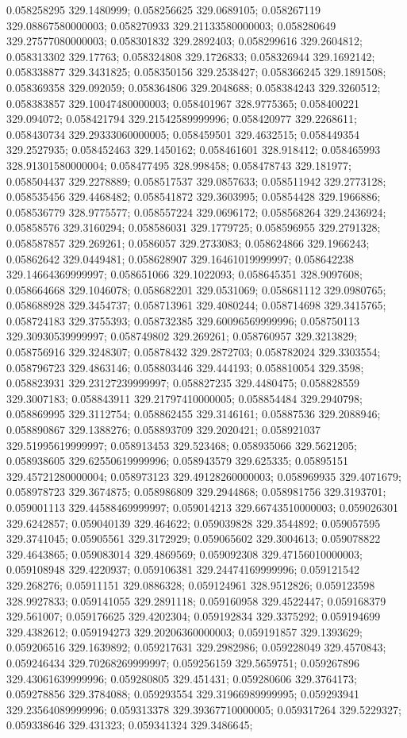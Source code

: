 0.058258295 329.1480999; 0.058256625 329.0689105; 0.058267119 329.08867580000003; 0.058270933 329.21133580000003; 0.058280649 329.27577080000003; 0.058301832 329.2892403; 0.058299616 329.2604812; 0.058313302 329.17763; 0.058324808 329.1726833; 0.058326944 329.1692142; 0.058338877 329.3431825; 0.058350156 329.2538427; 0.058366245 329.1891508; 0.058369358 329.092059; 0.058364806 329.2048688; 0.058384243 329.3260512; 0.058383857 329.10047480000003; 0.058401967 328.9775365; 0.058400221 329.094072; 0.058421794 329.21542589999996; 0.058420977 329.2268611; 0.058430734 329.29333060000005; 0.058459501 329.4632515; 0.058449354 329.2527935; 0.058452463 329.1450162; 0.058461601 328.918412; 0.058465993 328.91301580000004; 0.058477495 328.998458; 0.058478743 329.181977; 0.058504437 329.2278889; 0.058517537 329.0857633; 0.058511942 329.2773128; 0.058535456 329.4468482; 0.058541872 329.3603995; 0.05854428 329.1966886; 0.058536779 328.9775577; 0.058557224 329.0696172; 0.058568264 329.2436924; 0.05858576 329.3160294; 0.058586031 329.1779725; 0.058596955 329.2791328; 0.058587857 329.269261; 0.0586057 329.2733083; 0.058624866 329.1966243; 0.05862642 329.0449481; 0.058628907 329.16461019999997; 0.058642238 329.14664369999997; 0.058651066 329.1022093; 0.058645351 328.9097608; 0.058664668 329.1046078; 0.058682201 329.0531069; 0.058681112 329.0980765; 0.058688928 329.3454737; 0.058713961 329.4080244; 0.058714698 329.3415765; 0.058724183 329.3755393; 0.058732385 329.60096569999996; 0.058750113 329.30930539999997; 0.058749802 329.269261; 0.058760957 329.3213829; 0.058756916 329.3248307; 0.05878432 329.2872703; 0.058782024 329.3303554; 0.058796723 329.4863146; 0.058803446 329.444193; 0.058810054 329.3598; 0.058823931 329.23127239999997; 0.058827235 329.4480475; 0.058828559 329.3007183; 0.058843911 329.21797410000005; 0.058854484 329.2940798; 0.058869995 329.3112754; 0.058862455 329.3146161; 0.05887536 329.2088946; 0.058890867 329.1388276; 0.058893709 329.2020421; 0.058921037 329.51995619999997; 0.058913453 329.523468; 0.058935066 329.5621205; 0.058938605 329.62550619999996; 0.058943579 329.625335; 0.05895151 329.45721280000004; 0.058973123 329.49128260000003; 0.058969935 329.4071679; 0.058978723 329.3674875; 0.058986809 329.2944868; 0.058981756 329.3193701; 0.059001113 329.44588469999997; 0.059014213 329.66743510000003; 0.059026301 329.6242857; 0.059040139 329.464622; 0.059039828 329.3544892; 0.059057595 329.3741045; 0.05905561 329.3172929; 0.059065602 329.3004613; 0.059078822 329.4643865; 0.059083014 329.4869569; 0.059092308 329.47156010000003; 0.059108948 329.4220937; 0.059106381 329.24474169999996; 0.059121542 329.268276; 0.05911151 329.0886328; 0.059124961 328.9512826; 0.059123598 328.9927833; 0.059141055 329.2891118; 0.059160958 329.4522447; 0.059168379 329.561007; 0.059176625 329.4202304; 0.059192834 329.3375292; 0.059194699 329.4382612; 0.059194273 329.20206360000003; 0.059191857 329.1393629; 0.059206516 329.1639892; 0.059217631 329.2982986; 0.059228049 329.4570843; 0.059246434 329.70268269999997; 0.059256159 329.5659751; 0.059267896 329.43061639999996; 0.059280805 329.451431; 0.059280606 329.3764173; 0.059278856 329.3784088; 0.059293554 329.31966989999995; 0.059293941 329.23564089999996; 0.059313378 329.39367710000005; 0.059317264 329.5229327; 0.059338646 329.431323; 0.059341324 329.3486645; 
